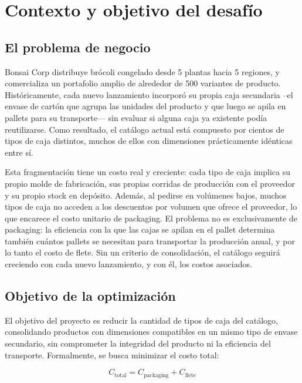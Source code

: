\documentclass[11pt]{article}
\begin{document}
\section{Contexto y objetivo del desafío}

\subsection{El problema de negocio}

Bonsai Corp distribuye brócoli congelado desde 5 plantas hacia 5 regiones, y comercializa
un portafolio amplio de alrededor de 500 variantes de producto. Históricamente, cada nuevo
lanzamiento incorporó su propia caja secundaria --el envase de cartón que agrupa las
unidades del producto y que luego se apila en pallets para su transporte--- sin evaluar si
alguna caja ya existente podía reutilizarse. Como resultado, el catálogo actual está
compuesto por cientos de tipos de caja distintos, muchos de ellos con dimensiones
prácticamente idénticas entre sí.

Esta fragmentación tiene un costo real y creciente: cada tipo de caja implica su propio
molde de fabricación, sus propias corridas de producción con el proveedor y su propio
stock en depósito. Además, al pedirse en volúmenes bajos, muchos tipos de caja no acceden
a los descuentos por volumen que ofrece el proveedor, lo que encarece el costo unitario de
packaging. El problema no es exclusivamente de packaging: la eficiencia con la que las
cajas se apilan en el pallet determina también cuántos pallets se necesitan para
transportar la producción anual, y por lo tanto el costo de flete. Sin un criterio de
consolidación, el catálogo seguirá creciendo con cada nuevo lanzamiento, y con él, los
costos asociados.

\subsection{Objetivo de la optimización}

El objetivo del proyecto es reducir la cantidad de tipos de caja del catálogo,
consolidando productos con dimensiones compatibles en un mismo tipo de envase secundario,
sin comprometer la integridad del producto ni la eficiencia del transporte. Formalmente,
se busca minimizar el costo total:

\begin{equation*}
C_{\text{total}} = C_{\text{packaging}} + C_{\text{flete}}
\end{equation*}
\end{document}
